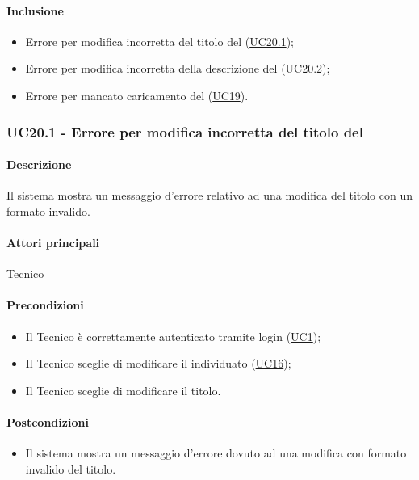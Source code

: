 \paragraph*{Inclusione}
\begin{itemize}
    \item Errore per modifica incorretta del titolo del  (\hyperref[UC20point1]{UC20.1});
    \item Errore per modifica incorretta della descrizione del  (\hyperref[UC20point2]{UC20.2});
    \item Errore per mancato caricamento del  (\hyperref[UC19]{UC19}).
\end{itemize}


\subsubsection{UC20.1 - Errore per modifica incorretta del titolo del }\label{UC20point1}
\paragraph*{Descrizione}
Il sistema mostra un messaggio d’errore relativo ad una modifica del titolo con un formato invalido.

\paragraph*{Attori principali}
Tecnico

\paragraph*{Precondizioni}
\begin{itemize}
  \item Il Tecnico è correttamente autenticato tramite login (\hyperref[UC1]{UC1});
  \item Il Tecnico sceglie di modificare il  individuato (\hyperref[UC16]{UC16});
  \item Il Tecnico sceglie di modificare il titolo.
\end{itemize}

\paragraph*{Postcondizioni}
\begin{itemize}
  \item Il sistema mostra un messaggio d’errore dovuto ad una modifica con formato invalido del titolo.
\end{itemize}

